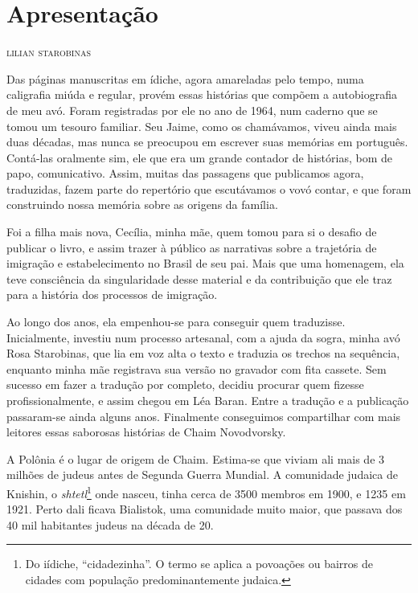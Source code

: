 \chapter[Apresentação, \textit{por Lilian Starobinas}]{Apresentação}

\begin{flushright}
\textsc{lilian starobinas}
\end{flushright}\medskip

\noindent{}Das páginas manuscritas em ídiche, agora amareladas pelo tempo, numa
caligrafia miúda e regular, provém essas histórias que compõem a
autobiografia de meu avó. Foram registradas por ele no ano de 1964, num
caderno que se tomou um tesouro familiar. Seu Jaime, como os chamávamos,
viveu ainda mais duas décadas, mas nunca se preocupou em escrever suas
memórias em português. Contá-las oralmente sim, ele que era um grande
contador de histórias, bom de papo, comunicativo. Assim, muitas das
passagens que publicamos agora, traduzidas, fazem parte do repertório que
escutávamos o vovó contar, e que foram construindo nossa memória sobre
as origens da família.

Foi a filha mais nova, Cecília, minha mãe, quem tomou para si o desafio
de publicar o livro, e assim trazer à público as narrativas sobre a
trajetória de imigração e estabelecimento no Brasil de seu pai. Mais que
uma homenagem, ela teve consciência da singularidade desse material e da
contribuição que ele traz para a história dos processos de imigração.

Ao longo dos anos, ela empenhou-se para conseguir quem traduzisse.
Inicialmente, investiu num processo artesanal, com a ajuda da sogra,
minha avó Rosa Starobinas, que lia em voz alta o texto e traduzia os
trechos na sequência, enquanto minha mãe registrava sua versão no
gravador com fita cassete. Sem sucesso em fazer a tradução por completo,
decidiu procurar quem fizesse profissionalmente, e assim chegou em Léa
Baran. Entre a tradução e a publicação passaram-se ainda alguns anos.
Finalmente conseguimos compartilhar com mais leitores essas saborosas
histórias de Chaim Novodvorsky.

A Polônia é o lugar de origem de Chaim. Estima-se que viviam ali mais de
3 milhões de judeus antes de Segunda Guerra Mundial. A comunidade
judaica de Knishin, o \textit{shtetl}\footnote{Do iídiche, ``cidadezinha''. O termo se aplica a povoações ou bairros de cidades com população predominantemente judaica.} onde nasceu, tinha cerca de
3500 membros em 1900, e 1235 em 1921. Perto dali ficava Bialistok, uma
comunidade muito maior, que passava dos 40 mil habitantes judeus na
década de 20.

